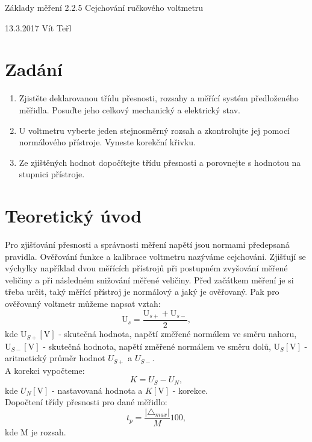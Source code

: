 \documentclass[12pt,a4paper]{report}
\begin{document}


\pagestyle{empty}

\begin{center}
\LARGE Základy měření 
\vfill
{\LARGE 2.2.5 Cejchování ručkového voltmetru }

\vfill

\end{center}

13.3.2017 \hfill Vít Teřl

\newpage

\section*{Zadání} 
\begin{enumerate}
    \item Zjistěte deklarovanou třídu přesnosti, rozsahy a měřící systém předloženého 
měřidla. Posuďte jeho celkový mechanický a elektrický stav.
    \item U voltmetru vyberte jeden stejnosměrný rozsah a zkontrolujte jej pomocí 
normálového přístroje. Vyneste korekční křivku.
    \item Ze zjištěných hodnot dopočítejte třídu přesnosti a porovnejte s
hodnotou na stupnici 
přístroje.
\end{enumerate}

\section*{Teoretický úvod}
Pro zjišťování přesnosti a správnosti měření napětí jsou normami předepsaná pravidla. Ověřování funkce a kalibrace voltmetru nazýváme cejchováni. Zjišťují se výchylky například dvou měřících přístrojů při postupném zvyšování měřené veličiny a při následném snižování měřené veličiny. Před začátkem měření je si třeba určit, taký měřící přístroj je normálový a jaký je ověřovaný. Pak pro ověřovaný voltmetr můžeme napsat vztah:
\begin{equation}
    \text{U}_s = \frac{\text{U}_{s+}+\text{U}_{s-}}{2},
\end{equation}
kde  $\text{U}_{S+}[\text{V}]$ - skutečná hodnota, napětí změřené normálem ve směru nahoru,
    $\text{U}_{S-}[\text{V}]$ - skutečná hodnota, napětí změřené normálem ve směru dolů,
    $\text{U}_S[\text{V}]$  - aritmetický průměr hodnot $U_{S+}$ a $U_{S-}$. \\
A korekci vypočteme:
\begin{equation}
    K=U_S-U_N,
\end{equation}
kde  $U_N[\text{V}]$ - nastavovaná hodnota a $K[\text{V}]$ - korekce. \\
Dopočtení třídy přesnosti pro dané měřidlo:
\begin{equation}
    t_p = \frac{|\triangle_{max}|}{M}100,
    \label{tp}
\end{equation}
kde M je rozsah.
\end{document}
